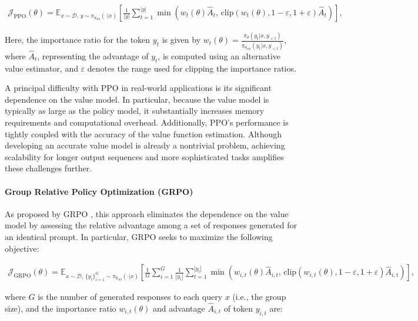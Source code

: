 \begin{align}
\mathcal{J}_\text{PPO}(\theta) = \mathbb{E}_{ x \sim \mathcal{D},\, y \sim \pi_{\theta_\text{old}}( \cdot | x) }
\left[ \frac{1}{|y|} \sum_{t=1}^{|y|} 
\min \left( w_{t}(\theta) \widehat{A}_{t},  \, \mathrm{clip} \left( w_{t}(\theta), 1 - {\varepsilon}, 1 + {\varepsilon}\right) \widehat{A}_{t} \right)
\right],
\end{align}

Here, the importance ratio for the token $y_t$ is given by $
w_{t}(\theta) = \frac{ \pi_{\theta} (y_{t} | x, y_{<t}) }{ \pi_{\theta_\text{old}} (y_{t} | x, y_{<t})}
$, where $\widehat{A}_{t}$, representing the advantage of $y_t$, is computed using an alternative value estimator, and $\varepsilon$ denotes the range used for clipping the importance ratios.

A principal difficulty with PPO in real-world applications is its significant dependence on the value model. In particular, because the value model is typically as large as the policy model, it substantially increases memory requirements and computational overhead. Additionally, PPO’s performance is tightly coupled with the accuracy of the value function estimation. Although developing an accurate value model is already a nontrivial problem, achieving scalability for longer output sequences and more sophisticated tasks amplifies these challenges further.

\paragraph{Group Relative Policy Optimization (GRPO)} As proposed by GRPO \citep{grpo}, this approach eliminates the dependence on the value model by assessing the relative advantage among a set of responses generated for an identical prompt. In particular, GRPO seeks to maximize the following objective:

\begin{align}
\label{equ:grpo}
\mathcal{J}_\text{GRPO}(\theta) = \mathbb{E}_{ x \sim \mathcal{D},\, \{y_i\}_{i=1}^G \sim \pi_{\theta_\text{old}}( \cdot | x) }
\left[ \frac{1}{G} \sum_{i=1}^{G} \frac{1}{|y_i|} \sum_{t=1}^{|y_i|} 
\min \left( w_{i,t}(\theta) \widehat{A}_{i,t},  \, \mathrm{clip} \left( w_{i,t}(\theta), 1 - {\varepsilon}, 1 + {\varepsilon}\right) \widehat{A}_{i,t} \right)
\right],
\end{align}

where $G$ is the number of generated responses to each query $x$ (i.e., the group size), and the importance ratio $w_{i,t}(\theta)$ and advantage $\widehat{A}_{i,t}$ of token $y_{i,t}$ are:

